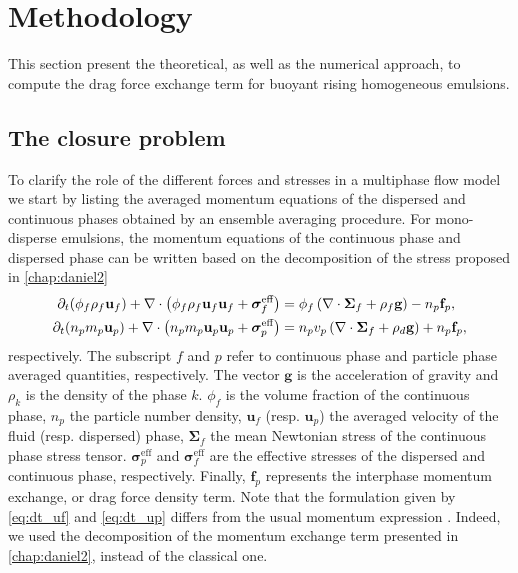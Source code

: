 \section{Methodology}
\label{sec:methodology_drag}
This section present the theoretical, as well as the numerical approach, to compute the drag force exchange term for buoyant rising homogeneous emulsions.

\subsection{The closure problem}
To clarify the role of the different forces and stresses in a multiphase flow model we start by listing the averaged momentum equations of the dispersed and continuous phases obtained by an ensemble averaging procedure.
For mono-disperse emulsions, the momentum equations of the continuous phase and dispersed phase can be written based on the decomposition of the stress proposed in \ref{chap:daniel2}
\begin{align}
    \pddt (\phi_f\rho_f \textbf{u}_f)
    + \div \left(\phi_f\rho_f \textbf{u}_f\textbf{u}_f + \bm{\sigma}_f^{\text{eff}}\right)
    &= \phi_f 
    \left(\div \bm{\Sigma}_f
    + \rho_f \textbf{g}\right)
    - n_p \textbf{f}_p, 
    \label{eq:dt_uf}
    \\
    \pddt (n_p  m_p  \textbf{u}_p)
    + \div \left(n_p m_p  \textbf{u}_p\textbf{u}_p
    +  \bm{\sigma}_p^{\text{eff}}\right)
    &= 
    n_p v_p \left(\div \bm{\Sigma}_f
    + \rho_d \textbf{g}\right)
    + n_p \textbf{f}_p, 
    \label{eq:dt_up}
\end{align}
respectively. 
The subscript $f$ and $p$ refer to continuous phase and particle phase averaged quantities, respectively.
The vector $\textbf{g}$ is the acceleration of gravity and $\rho_k$ is the density of the phase $k$. 
$\phi_f$ is the volume fraction of the continuous phase, $n_p$ the particle number density, $\textbf{u}_f$ (resp. $\textbf{u}_p$) the averaged velocity of the fluid (resp. dispersed) phase, $\bm{\Sigma}_f$ the mean Newtonian stress of the continuous phase stress tensor.
$\bm{\sigma}^{\text{eff}}_p$ and $\bm{\sigma}^{\text{eff}}_f$ are the effective stresses of the dispersed and continuous phase, respectively.  
Finally, $\textbf{f}_p$ represents the interphase momentum exchange, or drag force density term. 
Note that the formulation given by \ref{eq:dt_uf} and \ref{eq:dt_up} differs from the usual momentum expression \citep{wang2021numerical,wang2024effect}.
Indeed, we used the decomposition of the momentum exchange term presented in \ref{chap:daniel2}, instead of the classical one.
   

